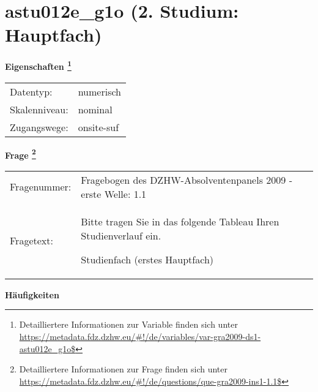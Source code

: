 
    \setcounter{footnote}{0}

    \vspace*{-1.8cm}
	\section{astu012e\_g1o (2. Studium: Hauptfach)}
	\label{section:astu012e_g1o}



    \vspace*{0.5cm}
    \noindent\textbf{Eigenschaften
	\footnote{Detailliertere Informationen zur Variable finden sich unter
		\url{https://metadata.fdz.dzhw.eu/\#!/de/variables/var-gra2009-ds1-astu012e_g1o$}}}\\
	\begin{tabularx}{\hsize}{@{}lX}
	Datentyp: & numerisch \\
	Skalenniveau: & nominal \\
	Zugangswege: &
	  onsite-suf
 \\
    \end{tabularx}



				\vspace*{0.5cm}
                \noindent\textbf{Frage
	                \footnote{Detailliertere Informationen zur Frage finden sich unter
		              \url{https://metadata.fdz.dzhw.eu/\#!/de/questions/que-gra2009-ins1-1.1$}}}\\
				\begin{tabularx}{\hsize}{@{}lX}
					Fragenummer: &
					  Fragebogen des DZHW-Absolventenpanels 2009 - erste Welle:
					  1.1
 \\
					Fragetext: & Bitte tragen Sie in das folgende Tableau Ihren Studienverlauf ein.\par  Studienfach (erstes Hauptfach) \\
				\end{tabularx}





        		\vspace*{0.5cm}
                \noindent\textbf{Häufigkeiten}


